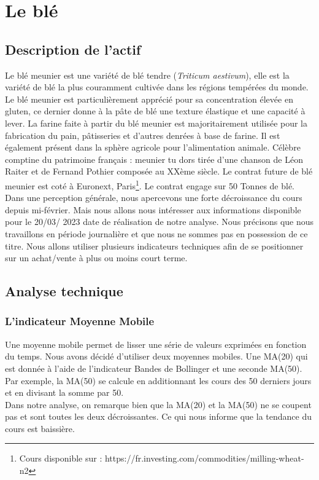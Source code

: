 \documentclass[12pt,a4paper]{article}
\begin{document}
\section{Le blé}
\subsection{Description de l'actif}
Le blé meunier est une variété de blé tendre (\textit{Triticum aestivum}), elle est la variété de blé la plus couramment cultivée dans les régions tempérées 
du monde. Le blé meunier est particulièrement apprécié pour sa concentration élevée en gluten, ce dernier donne à la pâte de blé une texture élastique et une capacité à 
lever. La farine faite à partir du blé meunier est majoritairement utilisée pour la fabrication du pain, pâtisseries et d'autres denrées à base de farine. Il est également 
présent dans la sphère agricole pour l'alimentation animale.
Célèbre comptine du patrimoine français : meunier tu dors tirée d'une chanson de Léon Raiter et de Fernand Pothier composée au XXème siècle. 
Le contrat future de blé meunier est coté à Euronext, Paris\footnote{Cours disponible sur : https://fr.investing.com/commodities/milling-wheat-n2}. Le contrat engage sur 
50 Tonnes de blé.\\[11pt]
Dans une perception générale, nous apercevons une forte décroissance du cours depuis mi-février. Mais nous allons nous intéresser aux informations disponible pour le 20/03/
2023 date de réalisation de notre analyse. 
Nous précisons que nous travaillons en période journalière et que nous ne sommes pas en possession de ce titre. Nous allons utiliser plusieurs indicateurs techniques afin 
de se positionner sur un achat/vente à plus ou moins court terme.
\subsection{Analyse technique}
\subsubsection*{L'indicateur Moyenne Mobile} 
Une moyenne mobile permet de lisser une série de valeurs exprimées en fonction du temps. Nous avons décidé d'utiliser deux moyennes mobiles. Une MA(20) qui est donnée à 
l'aide de l'indicateur Bandes de Bollinger et une seconde MA(50). Par exemple, la MA(50) se calcule en additionnant les cours des 50 derniers jours et en divisant la 
somme par 50.\\
Dans notre analyse, on remarque bien que la MA(20) et la MA(50) ne se coupent pas et sont toutes les deux décroissantes. Ce qui nous informe que la tendance du cours est 
baissière.
\end{document}
